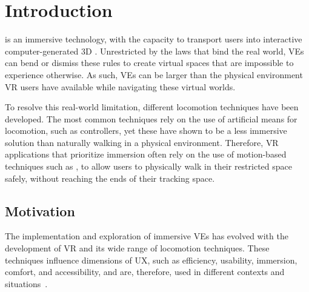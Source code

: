
%

\chapter{Introduction}     
\label{cha:introduction}

\newcommand{\Overleaf}{\href{https://www.overleaf.com?r=f5160636&rm=d&rs=b}{Overleaf}}

\epigraphfontsize{\small\itshape}
\setlength\epigraphwidth{12.5cm}
\setlength\epigraphrule{0pt}


 is an immersive technology, with the capacity to transport users into interactive computer-generated 3D . Unrestricted 
by the laws that bind the real world, \glspl{VE} can bend or dismiss these rules to create virtual spaces that are impossible to experience otherwise. 
As such, \glspl{VE} can be larger than the physical environment \gls{VR} users have available while navigating these virtual worlds. 

To resolve this real-world limitation, different locomotion techniques have been developed. The most common techniques rely on the use of artificial means for 
locomotion, such as controllers, yet these have shown to be a less immersive solution than naturally walking in a physical environment. Therefore,
\gls{VR} applications that prioritize immersion often rely on the use of motion-based techniques such as , to allow users to physically 
walk in their restricted space safely, without reaching the ends of their tracking space. 



\section{Motivation}
\label{sec:Motivation}

The implementation and exploration of immersive \glspl{VE} has evolved with the development of \gls{VR} and its wide 
range of locomotion techniques. 
These techniques influence dimensions of \gls{UX}, such as efficiency, usability, immersion, comfort, and accessibility, and are, 
therefore, used in different contexts and situations~\cite{Boletsis2019}.


